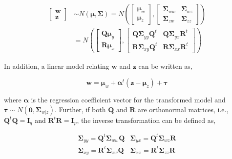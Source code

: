 \documentclass[3p,times,12pt,authoryear]{elsarticle}
\theoremstyle{definition}
\theoremstyle{definition}
\theoremstyle{remark}
\begin{document}
\begin{align}
  \begin{bmatrix}\mathbf{w} \\ 
  \mathbf{z}\end{bmatrix}  & \sim N \left(\boldsymbol{\mu}, \boldsymbol{\Sigma}\right)
  = N \left(
    \begin{bmatrix}
      \boldsymbol{\mu}_w \\ \boldsymbol{\mu}_z
    \end{bmatrix},
    \begin{bmatrix}
      \boldsymbol{\Sigma}_{ww} & \boldsymbol{\Sigma}_{wz} \\
      \boldsymbol{\Sigma}_{zw} & \boldsymbol{\Sigma}_{zz}
    \end{bmatrix} \right) \nonumber \\
  &= N \left(
    \begin{bmatrix}
      \boldsymbol{Q\mu}_y \\
      \boldsymbol{R\mu}_x
    \end{bmatrix},
    \begin{bmatrix}
      \boldsymbol{Q\Sigma}_{yy}\boldsymbol{Q}^t & \boldsymbol{Q\Sigma}_{yx}\mathbf{R}^t \\
      \boldsymbol{R\Sigma}_{xy}\boldsymbol{Q}^t & \boldsymbol{R\Sigma}_{xx}\mathbf{R}^t
    \end{bmatrix}
  \right)
  \label{eq:model3}
\end{align}

In addition, a linear model relating \(\mathbf{w}\) and \(\mathbf{z}\)
can be written as,

\begin{equation}
\mathbf{w} =    \boldsymbol{\mu}_w + \boldsymbol{\alpha}^t \left(\mathbf{z} - \boldsymbol{\mu}_z\right) + \boldsymbol{\tau}
\label{eq:latent-model}
\end{equation}

where \(\boldsymbol{\alpha}\) is the regression coefficient vector for
the transformed model and
\(\boldsymbol{\tau} \sim N\left(\mathbf{0}, \boldsymbol{\Sigma}_{w|z}\right)\).
Further, if both \(\mathbf{Q}\) and \(\mathbf{R}\) are orthonormal
matrices, i.e., \(\mathbf{Q}^t\mathbf{Q} = \mathbf{I}_q\) and
\(\mathbf{R}^t\mathbf{R} = \mathbf{I}_p\), the inverse transformation
can be defined as,

\begin{equation}
  \begin{matrix}
    \boldsymbol{\Sigma}_{yy} = \mathbf{Q}^t \boldsymbol{\Sigma}_{ww} \mathbf{Q} &
    \boldsymbol{\Sigma}_{yx} = \mathbf{Q}^t \boldsymbol{\Sigma}_{wz} \mathbf{R} \\
    \boldsymbol{\Sigma}_{xy} = \mathbf{R}^t \boldsymbol{\Sigma}_{zw} \mathbf{Q} &
    \boldsymbol{\Sigma}_{xx} = \mathbf{R}^t \boldsymbol{\Sigma}_{zz} \mathbf{R}
  \end{matrix}
  \label{eq:cov-yx-wz}
\end{equation}
\end{document}
